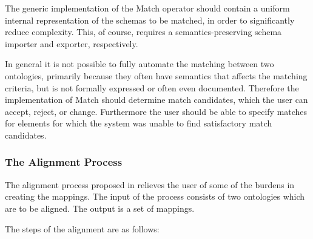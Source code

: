 \documentclass{fast_latex}
\begin{document}
The generic implementation of the Match operator should contain a
uniform internal representation of the schemas to be matched, in order
to significantly reduce complexity. This, of course, requires a
semantics-preserving schema importer and exporter, respectively. 

In general it is not possible to fully automate the matching between two
ontologies, primarily because they often have semantics that affects
the matching criteria, but is not formally expressed or often even
documented. Therefore the implementation of Match should determine
match candidates, which the user can accept, reject, or change.
Furthermore the user should be able to specify matches for elements for
which the system was unable to find satisfactory match candidates. 

\subsubsection{The Alignment Process}
The alignment process proposed in \cite{debruin2005wsml} relieves the user of
some of the burdens in creating the mappings. The input of the process
consists of two ontologies which are to be aligned. The output is a set
of mappings. 

The steps of the alignment are as follows: 
\end{document}
